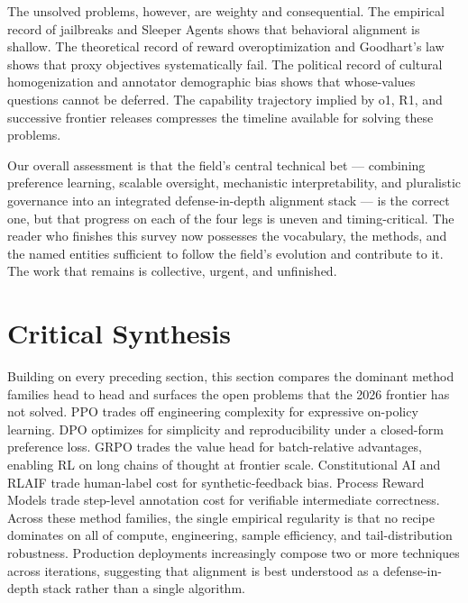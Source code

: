 \documentclass{article}
\begin{document}
The unsolved problems, however, are weighty and consequential. The empirical record of jailbreaks and Sleeper Agents shows that behavioral alignment is shallow. The theoretical record of reward overoptimization and Goodhart's law shows that proxy objectives systematically fail. The political record of cultural homogenization and annotator demographic bias shows that whose-values questions cannot be deferred. The capability trajectory implied by o1, R1, and successive frontier releases compresses the timeline available for solving these problems.

Our overall assessment is that the field's central technical bet --- combining preference learning, scalable oversight, mechanistic interpretability, and pluralistic governance into an integrated defense-in-depth alignment stack --- is the correct one, but that progress on each of the four legs is uneven and timing-critical. The reader who finishes this survey now possesses the vocabulary, the methods, and the named entities sufficient to follow the field's evolution and contribute to it. The work that remains is collective, urgent, and unfinished.

\section{Critical Synthesis}\label{critical-synthesis}

Building on every preceding section, this section compares the dominant method families head to head and surfaces the open problems that the 2026 frontier has not solved. PPO trades off engineering complexity for expressive on-policy learning. DPO optimizes for simplicity and reproducibility under a closed-form preference loss. GRPO trades the value head for batch-relative advantages, enabling RL on long chains of thought at frontier scale. Constitutional AI and RLAIF trade human-label cost for synthetic-feedback bias. Process Reward Models trade step-level annotation cost for verifiable intermediate correctness. Across these method families, the single empirical regularity is that no recipe dominates on all of compute, engineering, sample efficiency, and tail-distribution robustness. Production deployments increasingly compose two or more techniques across iterations, suggesting that alignment is best understood as a defense-in-depth stack rather than a single algorithm.
\end{document}
